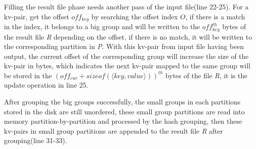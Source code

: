 Filling the result file phase needs another pass of the input file(line 22-25). For a kv-pair, get the offset ${off}_{key}$ by searching the offset index $O$, if there is a match in the index, it belongs to a big group and will be written to the ${off}^{th}_{key}$ bytes of the result file \emph{R} depending on the offset, if there is no match, it will be written to the corresponding partition in \emph{P}. With this kv-pair from input file having been output, the current offset of the corresponding group will increase the size of the kv-pair in bytes, which indicates the next kv-pair mapped to the same group will be stored in the ${({off}_{cur} + sizeof(\langle key,value\rangle ))}^{th}$ bytes of the file \emph{R}, it is the update operation in line 25. 

After grouping the big groups successfully, the small groups in each partitions stored in the disk are still unordered, these small group partitions are read into memory partition-by-partition and processed by the hash grouping, then these kv-pairs in small group partitions are appended to the result file \emph{R} after grouping(line 31-33). 







